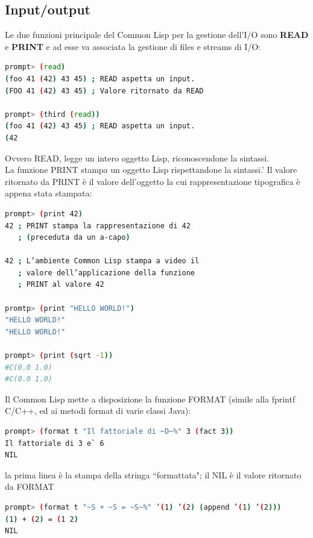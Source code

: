 \documentclass[a4paper,12pt, oneside]{book}
\begin{document}
\subsection{Input/output}
Le due funzioni principale del Common Lisp per la gestione
dell’I/O sono \textbf{READ} e \textbf{PRINT} e ad esse va associata la gestione di files e streams di I/O:
\begin{shaded}
\begin{lstlisting}[language=bash]
prompt> (read)
(foo 41 (42) 43 45) ; READ aspetta un input.
(FOO 41 (42) 43 45) ; Valore ritornato da READ

prompt> (third (read))
(foo 41 (42) 43 45) ; READ aspetta un input.
(42
\end{lstlisting}
\end{shaded}
Ovvero READ, legge un intero oggetto Lisp,
riconoscendone la sintassi.\\La funzione PRINT stampa un oggetto Lisp rispettandone la sintassi.'
Il valore ritornato da PRINT è il valore dell’oggetto la cui rappresentazione tipografica è
appena stata stampata:
\begin{shaded}
\begin{lstlisting}[language=bash]
prompt> (print 42)
42 ; PRINT stampa la rappresentazione di 42
   ; (preceduta da un a-capo)

42 ; L’ambiente Common Lisp stampa a video il
   ; valore dell’applicazione della funzione
   ; PRINT al valore 42
   
promtp> (print "HELLO WORLD!")
"HELLO WORLD!"
"HELLO WORLD!"

prompt> (print (sqrt -1))
#C(0.0 1.0)
#C(0.0 1.0) 
\end{lstlisting}
\end{shaded}
Il Common Lisp mette a disposizione la funzione FORMAT (simile alla
fprintf C/C++, ed ai metodi format di varie classi Java):
\begin{shaded}
\begin{lstlisting}[language=bash]
prompt> (format t "Il fattoriale di ~D~%" 3 (fact 3))
Il fattoriale di 3 e` 6
NIL
\end{lstlisting}
\end{shaded}
la prima linea è la stampa della stringa “formattata"; il NIL è il valore
ritornato da FORMAT
\begin{shaded}
\begin{lstlisting}[language=bash]
prompt> (format t "~S + ~S = ~S~%" ’(1) ’(2) (append ’(1) ’(2)))
(1) + (2) = (1 2)
NIL
\end{lstlisting}
\end{shaded}
\end{document}
